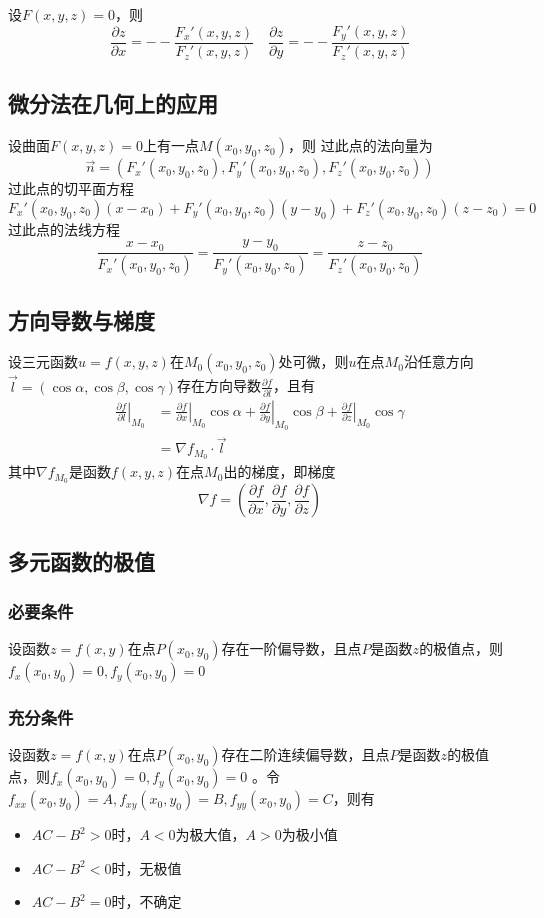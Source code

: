 设$F(x,y,z)=0$，则
\[\frac{\partial z}{\partial x}=--\frac{F_x'(x,y,z)}{F_z'(x,y,z)}\quad \frac{\partial z}{\partial y}=--\frac{F_y'(x,y,z)}{F_z'(x,y,z)}\]
\subsection{微分法在几何上的应用}
设曲面$F(x,y,z)=0$上有一点$M(x_0,y_0,z_0)$，则
过此点的法向量为
\[
\vec{n}=\left(F_{x}'\left(x_{0}, y_{0}, z_{0}\right), F_{y}'\left(x_{0}, y_{0}, z_{0}\right), F_{z}'\left(x_{0}, y_{0}, z_{0}\right)\right)
\]
过此点的切平面方程
\[
F_{x}'\left(x_{0}, y_{0}, z_{0}\right)\left(x-x_{0}\right)+F_{y}'\left(x_{0}, y_{0}, z_{0}\right)\left(y-y_{0}\right)+F_{z}'\left(x_{0}, y_{0}, z_{0}\right)\left(z-z_{0}\right)=0
\]
过此点的法线方程
\[
\frac{x-x_{0}}{F_x'\left(x_{0}, y_{0}, z_{0}\right)}=\frac{y-y_{0}}{F_{y}'\left(x_{0}, y_{0}, z_{0}\right)}=\frac{z-z_{0}}{F_{z}'\left(x_{0}, y_{0}, z_{0}\right)}
\]
\subsection{方向导数与梯度}
设三元函数$u=f(x,y,z)$在$M_0(x_0,y_0,z_0)$处可微，则$u$在点$M_0$沿任意方向$\vec{l}=(\cos\alpha,\cos\beta,\cos\gamma)$存在方向导数$\frac{\partial f}{\partial l}$，且有
\begin{align*}
    \left.\frac{\partial f}{\partial l}\right|_{M_0}&=
\left.\frac{\partial f}{\partial x}\right|_{M_0}\cos\alpha+
\left.\frac{\partial f}{\partial y}\right|_{M_0}\cos\beta+
\left.\frac{\partial f}{\partial z}\right|_{M_0}\cos\gamma\\
&=\nabla f_{M_0}\cdot\vec{l}
\end{align*}
其中$\nabla f_{M_0}$是函数$f(x,y,z)$在点$M_0$出的梯度，即梯度
\[\nabla f=\left(\frac{\partial f}{\partial x},\frac{\partial f}{\partial y},\frac{\partial f}{\partial z}\right)\]
\subsection{多元函数的极值}
\subsubsection{必要条件}
设函数$z=f(x,y)$在点$P(x_0,y_0)$存在一阶偏导数，且点$P$是函数$z$的极值点，则$f_x(x_0,y_0)=0,f_y(x_0,y_0)=0$
\subsubsection{充分条件} 
设函数$z=f(x,y)$在点$P(x_0,y_0)$存在二阶连续偏导数，且点$P$是函数$z$的极值点，则$f_x(x_0,y_0)=0,f_y(x_0,y_0)=0$ 。令$f_{xx}(x_0,y_0)=A,f_{xy}(x_0,y_0)=B,f_{yy}(x_0,y_0)=C$，则有
\begin{itemize}[nosep,left=\parindent,align=left]
    \item $AC-B^2>0$时，$A<0$为极大值，$A>0$为极小值
    \item $AC-B^2<0$时，无极值
    \item $AC-B^2=0$时，不确定
\end{itemize}

